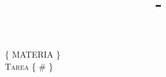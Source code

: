 \documentclass[10pt,spanish]{article}
\title{\Tarea - \Titulo}
\newcommand{\Tarea}{Tarea \{ \# \}}
\newcommand{\Materia}{\{ MATERIA \}}
\numberwithin{figure}{section} %
\begin{document}
\begin{minipage}{0.48\textwidth} \begin{flushleft}
\end{flushleft}\end{minipage}

\begin{center}																		%
\newcommand{\HRule}{\rule{\linewidth}{0.5mm}}									%


\vspace*{1cm}								%
\textsc{\huge \Materia}\\[1.5cm]	

\textsc{\huge \Tarea				%
}\\[1.5cm]													%


\end{center}
\end{document}
